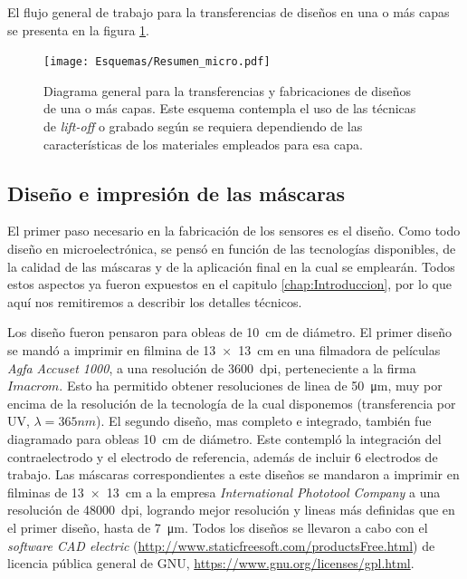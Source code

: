 	 El flujo general de trabajo para la transferencias de diseños en una o más capas se presenta en la figura \ref{esq:micro}.

			\begin{figure}[ht]
			  \begin{center}
			  \texttt{[image: Esquemas/Resumen\_micro.pdf]}
			  \caption[Esquema para la transferencia de diseños]{Diagrama general para la transferencias y fabricaciones de diseños de una o más capas. Este esquema contempla el uso de las técnicas de \textit{lift-off }o grabado según se requiera dependiendo de las características de los materiales empleados para esa capa.}
			  \label{esq:micro}
			  \end{center}
			  \end{figure}
			  
	\subsection{Diseño e impresión de las máscaras}\label{sec:impresion_mascaras}

		El primer paso necesario en la fabricación de los sensores es el diseño. Como todo diseño en microelectrónica, se pensó en función de las tecnologías disponibles, de la calidad de las máscaras y de la aplicación final en la cual se emplearán. Todos estos aspectos ya fueron expuestos en el capitulo \ref{chap:Introduccion}, por lo que aquí nos remitiremos a describir los detalles técnicos.

		Los diseño fueron pensaron para obleas de \SI{10}{\cm} de diámetro. El primer diseño se mandó a imprimir en filmina de \SI{13x13}{\cm} en una filmadora de películas \textit{Agfa Accuset 1000}, a una resolución de \SI{3600}{dpi}, perteneciente a la firma $Imacrom$. Esto ha permitido obtener resoluciones de linea de \SI{50}{\um}, muy por encima de la resolución de la tecnología de la cual disponemos (transferencia por UV, $\lambda=365nm$). El segundo diseño, mas completo e integrado, también fue diagramado para obleas \SI{10}{\cm} de diámetro. Este contempló la integración del contraelectrodo y el electrodo de referencia, además de incluir 6 electrodos de trabajo. Las máscaras correspondientes a este diseños se mandaron a imprimir en filminas de \SI{13x13}{\cm} a la empresa \textit{International Phototool Company} a una resolución de \SI{48000}{dpi}, logrando mejor resolución y lineas más definidas que en el primer diseño, hasta de \SI{7}{\um}. Todos los diseños se llevaron a cabo con el \textit{software CAD electric} (\url{http://www.staticfreesoft.com/productsFree.html}) de licencia pública general de GNU, \url{https://www.gnu.org/licenses/gpl.html}. 
				

